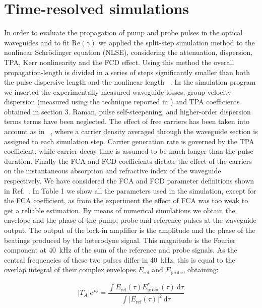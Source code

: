 \section{Time-resolved simulations}
In order to evaluate the propagation of pump and probe pulses in the optical waveguides and to fit Re$(\gamma)$ we applied the split-step simulation method to the nonlinear Schr\"{o}dinger equation (NLSE), considering the attenuation, dispersion, TPA, Kerr nonlinearity and the FCD effect.
Using this method the overall propagation-length is divided in a series of steps significantly smaller than both the pulse dispersive length and the nonlinear length ~\cite{Agrawal2001a,Lin2007}.
In the simulation program we inserted the experimentally measured waveguide losses, group velocity dispersion (measured using the technique reported in \cite{Mas2012}) and TPA coefficients obtained in section 3. Raman, pulse self-steepening, and higher-order dispersion terms terms have been neglected.
The effect of free carriers has been taken into account as in ~\cite{Lin2007}, where a carrier density averaged through the waveguide section is assigned to each simulation step. Carrier generation rate is governed by the TPA coefficient, while carrier decay time is assumed to be much longer than the pulse duration.
Finally the FCA and FCD coefficients dictate the effect of the carriers on the instantaneous absorption and refractive index of the waveguide respectively.
We have considered the FCA and FCD parameter definitions shown in Ref.~\cite{Lin2007}. In Table 1 we show all the parameters used in the simulation, except for the FCA coefficient, as from the experiment the effect of FCA was too weak to get a reliable estimation. By means of numerical simulations we obtain the envelope and the phase of the pump, probe and reference pulses at the waveguide output.
The output of the lock-in amplifier is the amplitude and the phase of the beatings produced by the heterodyne signal.
This magnitude is the Fourier component at 40~kHz of the sum of the reference and probe signals.
As the central frequencies of these two pulses differ in 40~kHz, this is equal to the overlap integral of their complex envelopes $E_{\mathrm{ref}}$ and $E_{\mathrm{probe}}$, obtaining:


                                                                \begin{equation}
                                                                        |T_{A}|e^{j\phi} =
                                                                        \frac{\int E_{\mathrm{ref}}(\tau) E^*_{\mathrm{probe}}(\tau) ~ \mathrm{d}\tau}
                                                                        {\int |E_{\mathrm{ref}}(\tau)|^2~\mathrm{d}\tau}
                                                                \end{equation}


